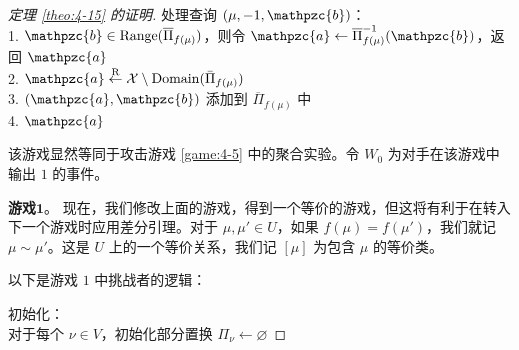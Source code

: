 \begin{proof}[定理 \ref{theo:4-15} 的证明]
\vspace{5pt}

\hspace*{5pt} 处理查询 $(\mu,-1,\mathpzc{b})$：\\
\hspace*{26pt} 1.\quad\; $\mathpzc{b}\in{\rm Range}(\overline\Pi_{f(\mu)})$，则令 $\mathpzc{a}\leftarrow\overline\Pi_{f(\mu)}^{-1}(\mathpzc{b})$，返回 $\mathpzc{a}$\\
\hspace*{26pt} 2.\quad\; $\mathpzc{a}\overset{\rm R}\leftarrow\mathcal{X}\setminus{\rm Domain}(\bar\Pi_{f(\mu)})$\\
\hspace*{26pt} 3.\quad\; $(\mathpzc{a},\mathpzc{b})$ 添加到 $\overline\Pi_{f(\mu)}$ 中\\
\hspace*{26pt} 4.\quad\; $\mathpzc{a}$

\vspace{5pt}

该游戏显然等同于攻击游戏 \ref{game:4-5} 中的聚合实验。令 $W_0$ 为对手在该游戏中输出 $1$ 的事件。

\vspace{5pt}

\noindent\textbf{游戏$\mathbf{1}$}。
现在，我们修改上面的游戏，得到一个等价的游戏，但这将有利于在转入下一个游戏时应用差分引理。对于 $\mu,\mu'\in U$，如果 $f(\mu)=f(\mu')$，我们就记 $\mu\sim\mu'$。这是 $U$ 上的一个等价关系，我们记 $[\mu]$ 为包含 $\mu$ 的等价类。

以下是游戏 $1$ 中挑战者的逻辑：

\vspace{5pt}

\hspace*{5pt} 初始化：\\
\hspace*{50pt} 对于每个 $\nu\in V$，初始化部分置换 $\Pi_\nu\leftarrow\varnothing$

\vspace{5pt}


\end{proof}
